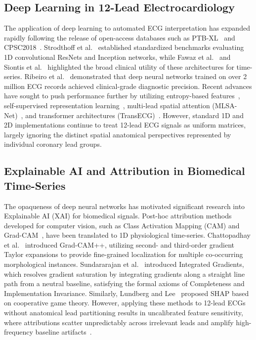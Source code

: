 \documentclass[5p,twocolumn,10pt]{elsarticle}
\begin{document}
\subsection{Deep Learning in 12-Lead Electrocardiology}
The application of deep learning to automated ECG interpretation has expanded rapidly following the release of open-access databases such as PTB-XL~\cite{wagner2020ptb} and CPSC2018~\cite{liu2018open}. Strodthoff et al.~\cite{strodthoff2020deep} established standardized benchmarks evaluating 1D convolutional ResNets and Inception networks, while Fawaz et al.~\cite{fawaz2019deep} and Siontis et al.~\cite{siontis2021artificial} highlighted the broad clinical utility of these architectures for time-series. Ribeiro et al.~\cite{ribeiro2020automatic} demonstrated that deep neural networks trained on over 2 million ECG records achieved clinical-grade diagnostic precision. Recent advances have sought to push performance further by utilizing entropy-based features~\cite{smigiel2021ecg}, self-supervised representation learning~\cite{mehari2022self}, multi-lead spatial attention (MLSA-Net)~\cite{mehari2023mlsa}, and transformer architectures (TransECG)~\cite{niu2023transecg, che2021constrained}. However, standard 1D and 2D implementations continue to treat 12-lead ECG signals as uniform matrices, largely ignoring the distinct spatial anatomical perspectives represented by individual coronary lead groups.

\subsection{Explainable AI and Attribution in Biomedical Time-Series}
The opaqueness of deep neural networks has motivated significant research into Explainable AI (XAI) for biomedical signals. Post-hoc attribution methods developed for computer vision, such as Class Activation Mapping (CAM) and Grad-CAM~\cite{selvaraju2017grad}, have been translated to 1D physiological time-series. Chattopadhay et al.~\cite{chattopadhay2018grad} introduced Grad-CAM++, utilizing second- and third-order gradient Taylor expansions to provide fine-grained localization for multiple co-occurring morphological instances. Sundararajan et al.~\cite{sundararajan2017axiomatic} introduced Integrated Gradients, which resolves gradient saturation by integrating gradients along a straight line path from a neutral baseline, satisfying the formal axioms of Completeness and Implementation Invariance. Similarly, Lundberg and Lee~\cite{lundberg2017unified} proposed SHAP based on cooperative game theory. However, applying these methods to 12-lead ECGs without anatomical lead partitioning results in uncalibrated feature sensitivity, where attributions scatter unpredictably across irrelevant leads and amplify high-frequency baseline artifacts~\cite{ismail2020benchmarking, tonekaboni2020went}.
\end{document}
